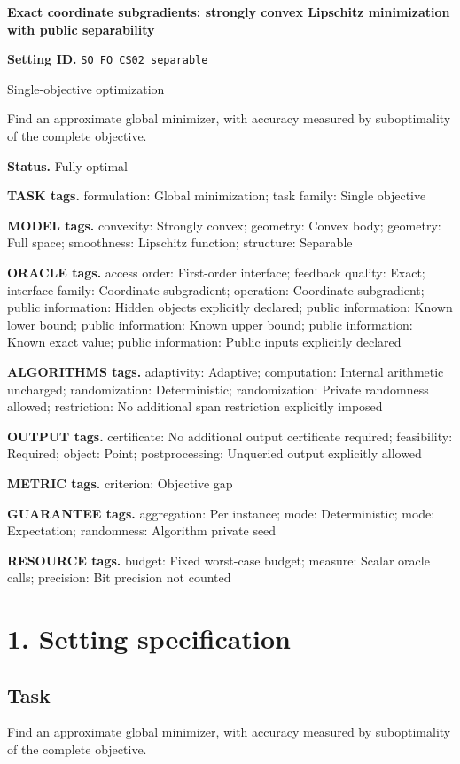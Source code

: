 \documentclass[10pt,a4paper]{article}
\begin{document}
\raggedright

{\LARGE\bfseries\sffamily\color{AtlasNavy} Exact coordinate subgradients: strongly convex Lipschitz minimization with public separability\par}\vspace{5pt}
\textbf{Setting ID.} \texttt{SO\_\allowbreak{}FO\_\allowbreak{}CS02\_\allowbreak{}separable}

Single-objective optimization

Find an approximate global minimizer, with accuracy measured by suboptimality of the complete objective.

\textbf{Status.} Fully optimal

\textbf{TASK tags.} formulation: Global minimization; task family: Single objective

\textbf{MODEL tags.} convexity: Strongly convex; geometry: Convex body; geometry: Full space; smoothness: Lipschitz function; structure: Separable

\textbf{ORACLE tags.} access order: First-order interface; feedback quality: Exact; interface family: Coordinate subgradient; operation: Coordinate subgradient; public information: Hidden objects explicitly declared; public information: Known lower bound; public information: Known upper bound; public information: Known exact value; public information: Public inputs explicitly declared

\textbf{ALGORITHMS tags.} adaptivity: Adaptive; computation: Internal arithmetic uncharged; randomization: Deterministic; randomization: Private randomness allowed; restriction: No additional span restriction explicitly imposed

\textbf{OUTPUT tags.} certificate: No additional output certificate required; feasibility: Required; object: Point; postprocessing: Unqueried output explicitly allowed

\textbf{METRIC tags.} criterion: Objective gap

\textbf{GUARANTEE tags.} aggregation: Per instance; mode: Deterministic; mode: Expectation; randomness: Algorithm private seed

\textbf{RESOURCE tags.} budget: Fixed worst-case budget; measure: Scalar oracle calls; precision: Bit precision not counted

\section{1. Setting specification}
\subsection{Task}
Find an approximate global minimizer, with accuracy measured by suboptimality of the complete objective.
\end{document}
